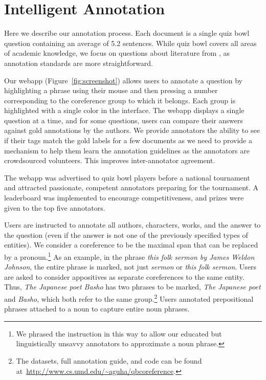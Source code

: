 
\section{Intelligent Annotation}
\label{sec:annotation}

Here we describe our annotation process.  Each document is a single quiz bowl
question containing an average of 5.2 sentences.  While quiz bowl covers all
areas of academic knowledge, we focus on questions about literature from
, as annotation standards are more straightforward.

Our webapp (Figure~\ref{fig:screenshot}) allows users to annotate a question by
highlighting a phrase using their mouse and then pressing a number corresponding
to the coreference group to which it belongs. Each group is highlighted with a
single color in the interface. The webapp displays a single question at a time,
and for some questions, users can compare their answers against gold annotations by the authors.
We provide annotators the ability to see if their tags match the gold labels for a few documents
as we need to provide a mechanism to help them learn the annotation guidelines as the annotators are crowdsourced volunteers.
This improves inter-annotator agreement.

The webapp was advertised to quiz bowl players before a national tournament and
attracted passionate, competent annotators preparing for the tournament. A
leaderboard was implemented to encourage competitiveness, and prizes were given
to the top five annotators.

Users are instructed to annotate all authors, characters, works, and the answer
to the question (even if the answer is not one of the previously specified types
of entities).  We consider a coreference to be the maximal span that can be
replaced by a pronoun.\footnote{We phrased the instruction in this way to allow
  our educated but linguistically unsavvy annotators to approximate a noun
  phrase.} As an example, in the phrase \emph{this folk sermon by James Weldon
  Johnson}, the entire phrase is marked, not just \emph{sermon} or \emph{this
  folk sermon}. Users are asked to consider appositives as separate coreferences
to the same entity. Thus, \emph{The Japanese poet Basho} has two phrases to be
marked, \emph{The Japanese poet} and \emph{Basho}, which both refer to the same
group.\footnote{The datasets, full annotation guide, and code can be found
  at~\url{http://www.cs.umd.edu/~aguha/qbcoreference}.} Users annotated
prepositional phrases attached to a noun to capture entire noun phrases.

